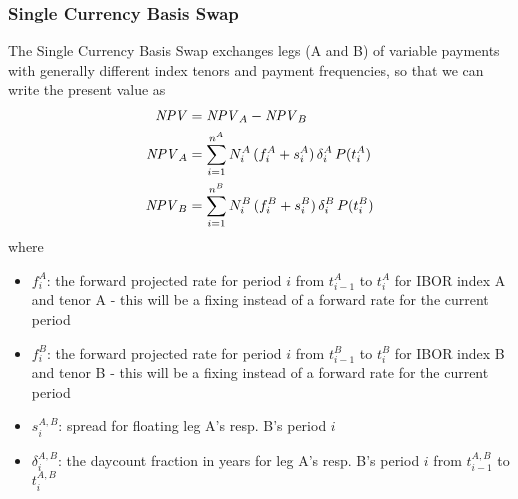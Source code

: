\subsubsection{Single Currency Basis Swap}
\label{pricing:ir_bs}

The Single Currency Basis Swap exchanges legs (A and B) of variable payments with generally different 
index tenors and payment frequencies, so that we can write the present value as
\begin{align*}
\mathit{NPV} &= \mathit{NPV}_{A} - \mathit{NPV}_{B} \\
\mathit{NPV}_{A} &= \sum_{i=1}^{n^{A}} N^{A}_i\,(f^A_i + s^A_i)\,\delta^{A}_i\,P(t^{A}_i)\\
\mathit{NPV}_{B} &= \sum_{i=1}^{n^{B}} N^{B}_i\,(f^B_i + s^B_i)\,\delta^{B}_i\,P(t^{B}_i)
\end{align*}
where 
\begin{itemize}
\item $f^A_i$: the forward projected rate for period $i$ from $t^{A}_{i-1}$ to $t^{A}_i$ for 
IBOR index A and tenor A - this will be a fixing instead of a forward rate for the 
current period
\item $f^B_i$: the forward projected rate for period $i$ from $t^{B}_{i-1}$ to $t^{B}_i$ for 
IBOR index B and tenor B - this will be a fixing instead of a forward rate for the 
current period
\item $s^{A,B}_i$: spread for floating leg A's resp. B's period $i$
\item $\delta^{A,B}_i$: the daycount fraction in years for leg A's resp. B's period $i$ from $t^{A,B}_{i-1}$ to $t^{A,B}_i$
\end{itemize}

